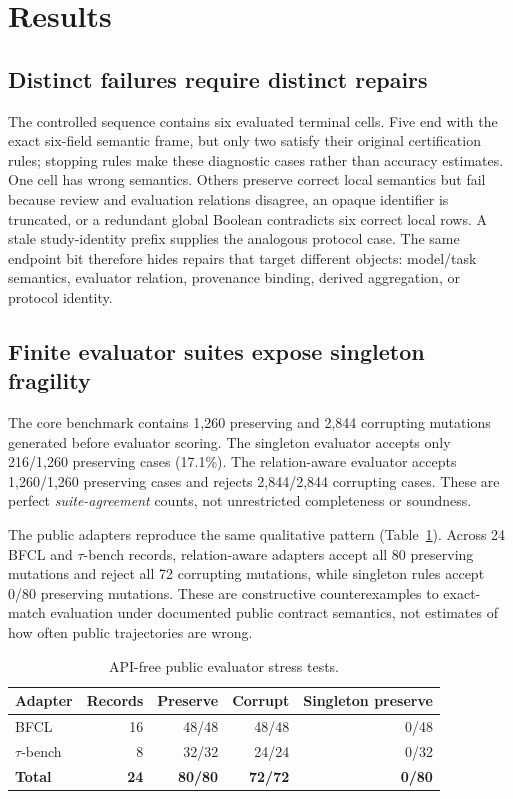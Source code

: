 \section{Results}
\label{sec:results}
\subsection{Distinct failures require distinct repairs}
The controlled sequence contains six evaluated terminal cells. Five end with the exact six-field semantic frame, but only two satisfy their original certification rules; stopping rules make these diagnostic cases rather than accuracy estimates. One cell has wrong semantics. Others preserve correct local semantics but fail because review and evaluation relations disagree, an opaque identifier is truncated, or a redundant global Boolean contradicts six correct local rows. A stale study-identity prefix supplies the analogous protocol case. The same endpoint bit therefore hides repairs that target different objects: model/task semantics, evaluator relation, provenance binding, derived aggregation, or protocol identity.

\subsection{Finite evaluator suites expose singleton fragility}
The core benchmark contains 1,260 preserving and 2,844 corrupting mutations generated before evaluator scoring. The singleton evaluator accepts only 216/1,260 preserving cases (17.1\%). The relation-aware evaluator accepts 1,260/1,260 preserving cases and rejects 2,844/2,844 corrupting cases. These are perfect \emph{suite-agreement} counts, not unrestricted completeness or soundness.

The public adapters reproduce the same qualitative pattern (Table~\ref{tab:public-metamorphic}). Across 24 BFCL and $\tau$-bench records, relation-aware adapters accept all 80 preserving mutations and reject all 72 corrupting mutations, while singleton rules accept 0/80 preserving mutations. These are constructive counterexamples to exact-match evaluation under documented public contract semantics, not estimates of how often public trajectories are wrong.

\begin{table}[t]
\centering
\small
\caption{API-free public evaluator stress tests.}
\label{tab:public-metamorphic}
\begin{tabular}{@{}lrrrr@{}}
\toprule
Adapter & Records & Preserve & Corrupt & Singleton preserve \\
\midrule
BFCL & 16 & 48/48 & 48/48 & 0/48 \\
$\tau$-bench & 8 & 32/32 & 24/24 & 0/32 \\
\textbf{Total} & \textbf{24} & \textbf{80/80} & \textbf{72/72} & \textbf{0/80} \\
\bottomrule
\end{tabular}
\end{table}

